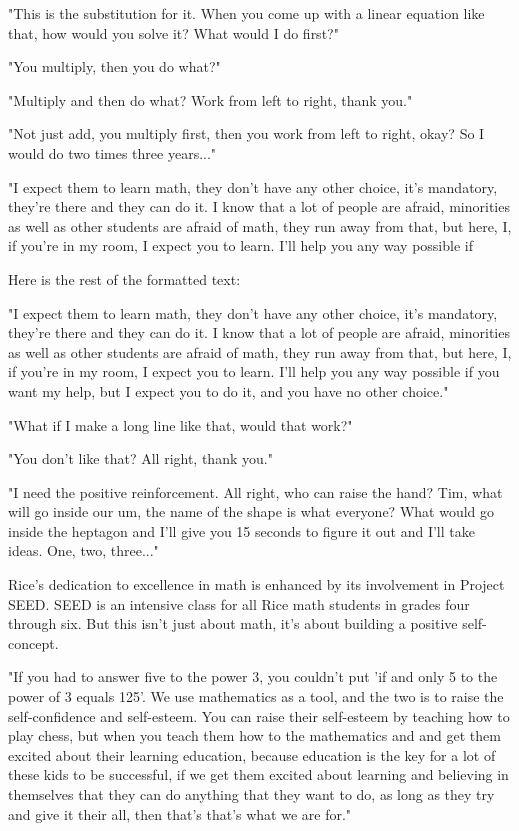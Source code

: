 "This is the substitution for it.
When you come up with a linear equation like that, how would you solve it?
What would I do first?"

"You multiply, then you do what?"

"Multiply and then do what?
Work from left to right, thank you."

"Not just add, you multiply first, then you work from left to right, okay?
So I would do two times three years..."

"I expect them to learn math, they don't have any other choice, it's mandatory, they're there and they can do it.
I know that a lot of people are afraid, minorities as well as other students are afraid of math, they run away from that, but here, I, if you're in my room, I expect you to learn.
I'll help you any way possible if

Here is the rest of the formatted text:

"I expect them to learn math, they don't have any other choice, it's mandatory, they're there and they can do it.
I know that a lot of people are afraid, minorities as well as other students are afraid of math, they run away from that, but here, I, if you're in my room, I expect you to learn.
I'll help you any way possible if you want my help, but I expect you to do it, and you have no other choice."

"What if I make a long line like that, would that work?"

"You don't like that?
All right, thank you."

"I need the positive reinforcement.
All right, who can raise the hand?
Tim, what will go inside our um, the name of the shape is what everyone?
What would go inside the heptagon and I'll give you 15 seconds to figure it out and I'll take ideas.
One, two, three..."

Rice's dedication to excellence in math is enhanced by its involvement in Project SEED.
SEED is an intensive class for all Rice math students in grades four through six.
But this isn't just about math, it's about building a positive self-concept.

"If you had to answer five to the power 3, you couldn't put 'if and only 5 to the power of 3 equals 125'.
We use mathematics as a tool, and the two is to raise the self-confidence and self-esteem.
You can raise their self-esteem by teaching how to play chess, but when you teach them how to the mathematics and and get them excited about their learning education, because education is the key for a lot of these kids to be successful, if we get them excited about learning and believing in themselves that they can do anything that they want to do, as long as they try and give it their all, then that's that's what we are for."

